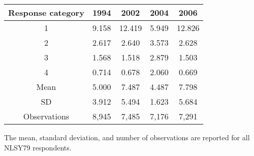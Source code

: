 {
	\begin{threeparttable}
		\begin{tabular}{c c c c c}
			\toprule
			Response category & 1994 & 2002 & 2004 & 2006 \\
			\midrule
			1 & 9.158 & 12.419 & 5.949 & 12.826 \\
			2 & 2.617 & 2.640 & 3.573 & 2.628 \\
			3 & 1.568 & 1.518 & 2.879 & 1.503 \\
			4 & 0.714 & 0.678 & 2.060 &  0.669 \\
			\midrule
			Mean & 5.000 & 7.487 & 4.487 & 7.798 \\
			SD & 3.912 & 5.494 & 1.623 & 5.684 \\
			Observations & 8,945 & 7,485 & 7,176 & 7,291 \\
			\bottomrule
		\end{tabular}
		\begin{tablenotes}[flushleft]\footnotesize
			\item The mean, standard deviation, and number of observations are reported for all NLSY79 respondents.
		\end{tablenotes}
	\end{threeparttable}
	
}